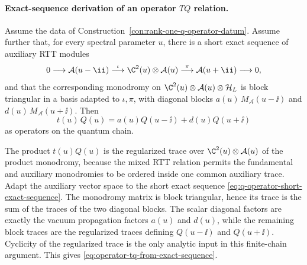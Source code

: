 \paragraph{Exact-sequence derivation of an operator \(TQ\) relation.}
Assume the data of Construction~\ref{con:rank-one-q-operator-datum}.  Assume
further that, for every spectral parameter \(u\), there is a short exact
sequence of auxiliary RTT modules
\begin{equation}
  0\longrightarrow
  \mathcal A(u-\ii)
  \stackrel{\iota}{\longrightarrow}
  \C^2(u)\otimes\mathcal A(u)
  \stackrel{\pi}{\longrightarrow}
  \mathcal A(u+\ii)
  \longrightarrow0 ,
  \label{eq:q-operator-short-exact-sequence}
\end{equation}
and that the corresponding monodromy on
\(\C^2(u)\otimes\mathcal A(u)\otimes\mathcal H_L\) is block triangular in a
basis adapted to \(\iota,\pi\), with diagonal blocks
\(a(u)\,M_{\mathcal A}(u-\ii)\) and
\(d(u)\,M_{\mathcal A}(u+\ii)\).  Then
\begin{equation}
  t(u)\,Q(u)
  =
  a(u)Q(u-\ii)+d(u)Q(u+\ii)
  \label{eq:operator-tq-from-exact-sequence}
\end{equation}
as operators on the quantum chain.

The product \(t(u)Q(u)\) is the regularized trace over
\(\C^2(u)\otimes\mathcal A(u)\) of the product monodromy, because the mixed
RTT relation permits the fundamental and auxiliary monodromies to be ordered
inside one common auxiliary trace.  Adapt the auxiliary vector space to the
short exact sequence \eqref{eq:q-operator-short-exact-sequence}.  The
monodromy matrix is block triangular, hence its trace is the sum of the
traces of the two diagonal blocks.  The scalar diagonal factors are exactly
the vacuum propagation factors \(a(u)\) and \(d(u)\), while the remaining
block traces are the regularized traces defining \(Q(u-\ii)\) and
\(Q(u+\ii)\).  Cyclicity of the regularized trace is the only analytic input
in this finite-chain argument.  This gives
\eqref{eq:operator-tq-from-exact-sequence}.


